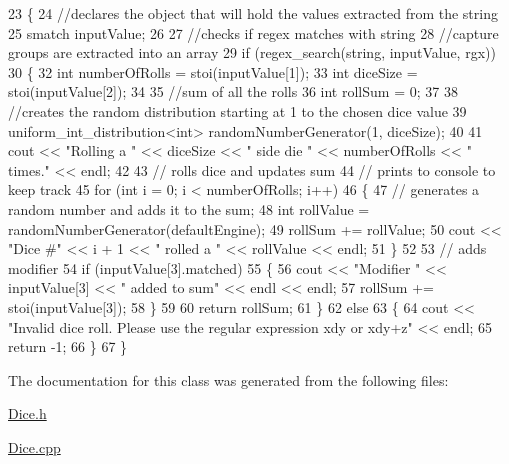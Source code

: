 \begin{DoxyCode}
23 \{
24     \textcolor{comment}{//declares the object that will hold the values extracted from the string}
25     smatch inputValue;
26 
27     \textcolor{comment}{//checks if regex matches with string}
28     \textcolor{comment}{//capture groups are extracted into an array}
29     \textcolor{keywordflow}{if} (regex\_search(\textcolor{keywordtype}{string}, inputValue, rgx))
30     \{
32         \textcolor{keywordtype}{int} numberOfRolls = stoi(inputValue[1]);
33         \textcolor{keywordtype}{int} diceSize = stoi(inputValue[2]);
34 
35         \textcolor{comment}{//sum of all the rolls}
36         \textcolor{keywordtype}{int} rollSum = 0;
37 
38         \textcolor{comment}{//creates the random distribution starting at 1 to the chosen dice value}
39         uniform\_int\_distribution<int> randomNumberGenerator(1, diceSize);
40 
41         cout << \textcolor{stringliteral}{"Rolling a "} << diceSize << \textcolor{stringliteral}{" side die "} << numberOfRolls << \textcolor{stringliteral}{" times."} << endl;
42 
43         \textcolor{comment}{// rolls dice and updates sum}
44         \textcolor{comment}{// prints to console to keep track}
45         \textcolor{keywordflow}{for} (\textcolor{keywordtype}{int} i = 0; i < numberOfRolls; i++)
46         \{
47             \textcolor{comment}{// generates a random number and adds it to the sum;}
48             \textcolor{keywordtype}{int} rollValue = randomNumberGenerator(defaultEngine);
49             rollSum += rollValue;
50             cout << \textcolor{stringliteral}{"Dice #"} << i + 1 << \textcolor{stringliteral}{" rolled a "} << rollValue << endl;
51         \}
52 
53         \textcolor{comment}{// adds modifier}
54         \textcolor{keywordflow}{if} (inputValue[3].matched)
55         \{
56             cout << \textcolor{stringliteral}{"Modifier "} << inputValue[3] << \textcolor{stringliteral}{" added to sum"} << endl << endl;
57             rollSum += stoi(inputValue[3]);
58         \}
59 
60         \textcolor{keywordflow}{return} rollSum;
61     \}
62     \textcolor{keywordflow}{else}
63     \{
64         cout << \textcolor{stringliteral}{"Invalid dice roll. Please use the regular expression xdy or xdy+z"} << endl;
65         \textcolor{keywordflow}{return} -1;
66     \}
67 \}
\end{DoxyCode}


The documentation for this class was generated from the following files\+:\begin{DoxyCompactItemize}
\item 
\hyperlink{_dice_8h}{Dice.\+h}\item 
\hyperlink{_dice_8cpp}{Dice.\+cpp}\end{DoxyCompactItemize}
